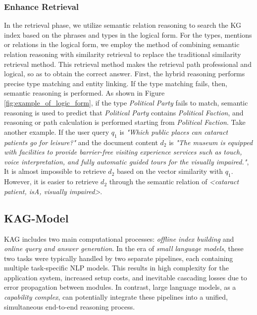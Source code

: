 \documentclass{article}
\begin{document}
\subsubsection{Enhance Retrieval}
In the retrieval phase, we utilize semantic relation reasoning to search the KG index based on the phrases and types in the logical form. For the types, mentions or relations in the logical form, we employ the method of combining semantic relation reasoning with similarity retrieval to replace the traditional similarity retrieval method. This retrieval method makes the retrieval path professional and logical, so as to obtain the correct answer. First, the hybrid reasoning performs precise type matching and entity linking. If the type matching fails, then, semantic reasoning is performed. As shown in Figure \ref{fig:example_of_logic_form}, if the type \textit{Political Party} fails to match, semantic reasoning is used to predict that \textit{Political Party} contains \textit{Political Faction}, and reasoning or path calculation is performed starting from \textit{Political Faction}. \newline \newline
Take another example. If the user query $q_1$ is \textit{"Which public places can cataract patients go for leisure?"} and the document content $d_2$ is \textit{"The museum is equipped with facilities to provide barrier-free visiting experience services such as touch, voice interpretation, and fully automatic guided tours for the visually impaired."}, It is almost impossible to retrieve $d_2$ based on the vector similarity with $q_1$. However, it is easier to retrieve $d_2$ through the semantic relation of \textit{<cataract patient, isA, visually impaired>}.

\subsection{KAG-Model}
KAG includes two main computational processes: \textit{offline index building} and \textit{online query and answer generation}. In the era of \textit{small language models}, these two tasks were typically handled by two separate pipelines, each containing multiple task-specific NLP models. This results in high complexity for the application system, increased setup costs, and inevitable cascading losses due to error propagation between modules. In contrast, large language models, as a \textit{capability complex}, can potentially integrate these pipelines into a unified, simultaneous end-to-end reasoning process.
\end{document}
